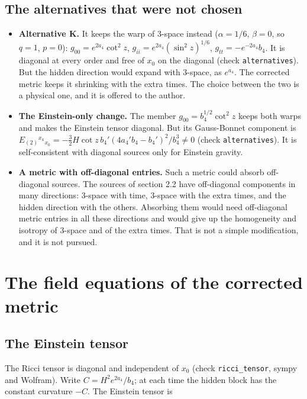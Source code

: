 \documentclass[11pt]{article}
\begin{document}
\subsection{The alternatives that were not chosen}

\begin{itemize}
\item \textbf{Alternative K.} It keeps the warp of 3-space instead ($\alpha = 1/6$, $\beta = 0$, so $q = 1$, $p = 0$): $g_{00} = e^{2a_4}\cot^2 z$, $g_{ii} = e^{2a_4}(\sin^2 z)^{1/6}$, $g_{tt} = -e^{-2a_4}b_4$. It is diagonal at every order and free of $x_0$ on the diagonal (check \texttt{alternat\allowbreak{}ives}). But the hidden direction would expand with 3-space, as $e^{a_4}$. The corrected metric keeps it shrinking with the extra times. The choice between the two is a physical one, and it is offered to the author.
\item \textbf{The Einstein-only change.} The member $g_{00} = b_4^{1/2}\cot^2 z$ keeps both warps and makes the Einstein tensor diagonal. But its Gauss-Bonnet component is $E_{(2)}{}^{x_4}{}_{x_0} = -\frac32 H\cot z\,b_4'(4a_4'b_4 - b_4')^2/b_4^3 \neq 0$ (check \texttt{alternat\allowbreak{}ives}). It is self-consistent with diagonal sources only for Einstein gravity.
\item \textbf{A metric with off-diagonal entries.} Such a metric could absorb off-diagonal sources. The sources of section 2.2 have off-diagonal components in many directions: 3-space with time, 3-space with the extra times, and the hidden direction with the others. Absorbing them would need off-diagonal metric entries in all these directions and would give up the homogeneity and isotropy of 3-space and of the extra times. That is not a simple modification, and it is not pursued.
\end{itemize}

\section{The field equations of the corrected metric}

\subsection{The Einstein tensor}

The Ricci tensor is diagonal and independent of $x_0$ (check \texttt{ricci\_te\allowbreak{}nsor}, sympy and Wolfram). Write $C = H^2e^{2a_4}/b_4$; at each time the hidden block has the constant curvature $-C$. The Einstein tensor is
\end{document}
